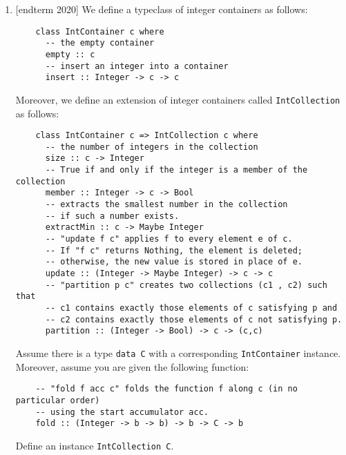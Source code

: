 \documentclass{article}
\def\code#1{\texttt{#1}}
\begin{document}
\begin{enumerate}
    \item {[endterm 2020]} We define a typeclass of integer containers as follows:
        \begin{verbatim}
    class IntContainer c where
      -- the empty container
      empty :: c
      -- insert an integer into a container
      insert :: Integer -> c -> c
        \end{verbatim}
        Moreover, we define an extension of integer containers called \code{IntCollection} as follows:
        \begin{verbatim}
    class IntContainer c => IntCollection c where
      -- the number of integers in the collection
      size :: c -> Integer
      -- True if and only if the integer is a member of the collection
      member :: Integer -> c -> Bool
      -- extracts the smallest number in the collection
      -- if such a number exists.
      extractMin :: c -> Maybe Integer
      -- "update f c" applies f to every element e of c.
      -- If "f c" returns Nothing, the element is deleted;
      -- otherwise, the new value is stored in place of e.
      update :: (Integer -> Maybe Integer) -> c -> c
      -- "partition p c" creates two collections (c1 , c2) such that
      -- c1 contains exactly those elements of c satisfying p and
      -- c2 contains exactly those elements of c not satisfying p.
      partition :: (Integer -> Bool) -> c -> (c,c)
        \end{verbatim}
        Assume there is a type \code{data C} with a corresponding \code{IntContainer} instance. Moreover, assume you are given the following function:
        \begin{verbatim}
    -- "fold f acc c" folds the function f along c (in no particular order)
    -- using the start accumulator acc.
    fold :: (Integer -> b -> b) -> b -> C -> b
        \end{verbatim}
        Define an instance \code{IntCollection C}.
\end{enumerate}
\end{document}
